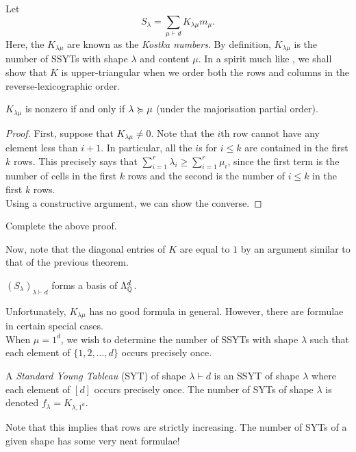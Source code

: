 	Let
	\begin{equation}
		\label{eqn: kostka}
		S_\lambda = \sum_{\mu \vdash d} K_{\lambda\mu} m_\mu.
	\end{equation}
	Here, the $K_{\lambda\mu}$ are known as the \emph{Kostka numbers}. By definition, $K_{\lambda\mu}$ is the number of SSYTs with shape $\lambda$ and content $\mu$. In a spirit much like , we shall show that $K$ is upper-triangular when we order both the rows and columns in the reverse-lexicographic order.

	\begin{ftheo}
		$K_{\lambda\mu}$ is nonzero if and only if $\lambda \succcurlyeq \mu$ (under the majorisation partial order).
	\end{ftheo}
	\begin{proof}
		First, suppose that $K_{\lambda\mu} \ne 0$. Note that the $i$th row cannot have any element less than $i+1$. In particular, all the $i$s for $i\le k$ are contained in the first $k$ rows. This precisely says that $\sum_{i=1}^r \lambda_i \ge \sum_{i=1}^r \mu_i$, since the first term is the number of cells in the first $k$ rows and the second is the number of $i \le k$ in the first $k$ rows.\\
		Using a constructive argument, we can show the converse.
	\end{proof}

	\begin{exercise}
		Complete the above proof.
	\end{exercise}

	Now, note that the diagonal entries of $K$ are equal to $1$ by an argument similar to that of the previous theorem.
	\begin{fcor}
		$(S_\lambda)_{\lambda \vdash d}$ forms a basis of $\Lambda_{\mathbb{Q}}^d$. 
	\end{fcor}

	Unfortunately, $K_{\lambda\mu}$ has no good formula in general. However, there are formulae in certain special cases.\\
	When $\mu = 1^d$, we wish to determine the number of SSYTs with shape $\lambda$ such that each element of $\{1,2,\ldots,d\}$ occurs precisely once.

	\begin{fdef}
		A \emph{Standard Young Tableau} (SYT) of shape $\lambda\vdash d$ is an SSYT of shape $\lambda$ where each element of $[d]$ occurs precisely once. The number of SYTs of shape $\lambda$ is denoted $f_\lambda = K_{\lambda,1^d}$.
	\end{fdef}
	Note that this implies that rows are strictly increasing. The number of SYTs of a given shape has some very neat formulae!

